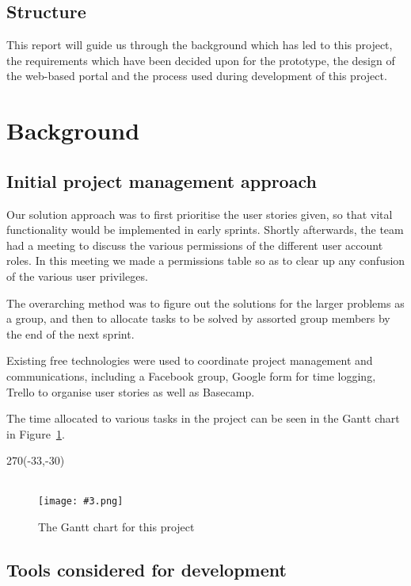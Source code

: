 \documentclass[a4paper,titlepage,12pt]{article}
\let\stdsection\section
\renewcommand\section{\newpage\stdsection}
\newcommand\figimg[4][\textwidth]{
	\begin{figure}
		\caption{#4}
		\label{fig:#2}
		\quad\\\texttt{[image: \#3.png]}
	\end{figure}
}
\begin{document}
\subsection{Structure}

This report will guide us through the background which has led to this project,
the requirements which have been decided upon for the prototype, the design of
the web-based portal and the process used during development of this project.

\section{Background}

\subsection{Initial project management approach}

Our solution approach was to first prioritise the user stories given, so that
vital functionality would be implemented in early sprints. Shortly afterwards,
the team had a meeting to discuss the various permissions of the different user
account roles. In this meeting we made a permissions table so as to clear up
any confusion of the various user privileges.

The overarching method was to figure out the solutions for the larger problems
as a group, and then to allocate tasks to be solved by assorted group members
by the end of the next sprint.

Existing free technologies were used to coordinate project management and
communications, including a Facebook group, Google form for time logging,
Trello to organise user stories as well as Basecamp.

The time allocated to various tasks in the project can be seen in the Gantt
chart in Figure~\ref{fig:gantt}.

\begin{landscape}
	\quad %
	\thispagestyle{empty}
	\begin{textblock}{270}(-33,-30)
		\figimg[280mm]{gantt}{gantt}
			{The Gantt chart for this project}
	\end{textblock}
\end{landscape}

\subsection{Tools considered for development}
\end{document}
